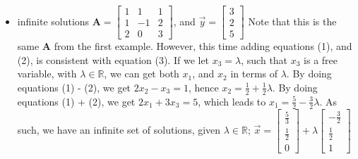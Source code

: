 \documentclass[a4paper, 12pt]{article}
\begin{document}
\begin{itemize}
                    \item infinite solutions
                        \subitem $\mathbf{A} = \begin{bmatrix}
                            1 & 1 & 1 \\
                            1 & -1 & 2 \\
                            2 & 0 & 3
                        \end{bmatrix}$, and $\vec{y} = \begin{bmatrix}
                            3 \\
                            2 \\
                            5
                        \end{bmatrix}$
                        \subitem Note that this is the same $\textbf{A}$ from the first example. However, this time adding equations (1), and (2), is consistent with equation (3). If we let $x_3 = \lambda$, such that $x_3$ is a free variable, with $\lambda \in \mathbb{R}$, we can get both $x_1$, and $x_2$ in terms of $\lambda$. By doing equations (1) - (2), we get $2x_2 - x_3 = 1$, hence $x_2 = \frac{1}{2} + \frac{1}{2}\lambda$. By doing equations (1) + (2), we get $2x_1 + 3x_3 = 5$, which leads to $x_1 = \frac{5}{2} - \frac{3}{2}\lambda$. As such, we have an infinite set of solutions, given $\lambda \in \mathbb{R}$;
                        \subitem $\vec{x} = \begin{bmatrix}
                            \frac{5}{3} \\
                            \frac{1}{2} \\
                            0
                        \end{bmatrix} + \lambda \begin{bmatrix}
                            -\frac{3}{2} \\
                            \frac{1}{2} \\
                            1
                        \end{bmatrix}$
                \end{itemize}
\end{document}
